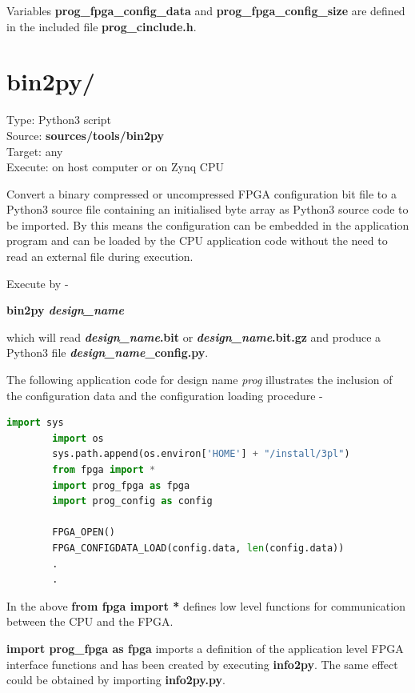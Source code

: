         Variables {\bf prog\_fpga\_config\_data} and {\bf prog\_fpga\_config\_size}
        are defined in the included file {\bf prog\_cinclude.h}.

    \section{bin2py/}
    
        Type: Python3 script\\        
        Source: {\bf sources/tools/bin2py}\\
        Target: any\\
        Execute: on host computer or on Zynq CPU
    
        Convert a binary compressed or uncompressed FPGA configuration bit file
        to a Python3 source file containing an initialised byte array as Python3
        source code to be imported. By this means the configuration can be
        embedded in the application program and can be loaded by the CPU
        application code without the need to read an external file during
        execution.
        
        Execute by -
        
        {\bf bin2py {\em design\_name}}
        
        which will read {\bf {\em design\_name}.bit} or {\bf {\em
        design\_name}.bit.gz} and produce a Python3 file {\bf {\em
        design\_name}\_config.py}.
        
        The following application code for design name {\em prog} illustrates
        the inclusion of the configuration data and the configuration
        loading procedure -
        \begin{lstlisting}[gobble=4, language=Python]
        import sys
        import os
        sys.path.append(os.environ['HOME'] + "/install/3pl")
        from fpga import *
        import prog_fpga as fpga
        import prog_config as config

        FPGA_OPEN()
        FPGA_CONFIGDATA_LOAD(config.data, len(config.data))
        .
        .
        \end{lstlisting}
        In the above {\bf from fpga import *} defines low level functions for
        communication between the CPU and the FPGA.       
        
        {\bf import prog\_fpga as fpga} imports a definition of the application
        level FPGA interface functions and has been created by executing {\bf
        info2py}. The same effect could be obtained by importing {\bf info2py.py}.
        
